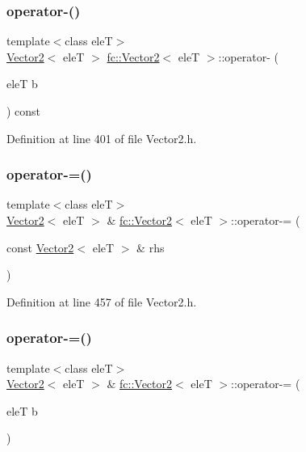\subsubsection{\texorpdfstring{operator-\/()}{operator-()}\hspace{0.1cm}{\footnotesize\ttfamily [2/2]}}
{\footnotesize\ttfamily template$<$class eleT$>$ \\
\hyperlink{classfc_1_1Vector2}{Vector2}$<$ eleT $>$ \hyperlink{classfc_1_1Vector2}{fc\+::\+Vector2}$<$ eleT $>$\+::operator-\/ (\begin{DoxyParamCaption}\item[{eleT}]{b }\end{DoxyParamCaption}) const}



Definition at line 401 of file Vector2.\+h.

\mbox{\label{classfc_1_1Vector2_acf30967fe6f42911aeea516543eb726e}} 
\subsubsection{\texorpdfstring{operator-\/=()}{operator-=()}\hspace{0.1cm}{\footnotesize\ttfamily [1/2]}}
{\footnotesize\ttfamily template$<$class eleT$>$ \\
\hyperlink{classfc_1_1Vector2}{Vector2}$<$ eleT $>$ \& \hyperlink{classfc_1_1Vector2}{fc\+::\+Vector2}$<$ eleT $>$\+::operator-\/= (\begin{DoxyParamCaption}\item[{const \hyperlink{classfc_1_1Vector2}{Vector2}$<$ eleT $>$ \&}]{rhs }\end{DoxyParamCaption})}



Definition at line 457 of file Vector2.\+h.

\mbox{\label{classfc_1_1Vector2_aea3fcca0a96a88e0d8623a07e140c669}} 
\subsubsection{\texorpdfstring{operator-\/=()}{operator-=()}\hspace{0.1cm}{\footnotesize\ttfamily [2/2]}}
{\footnotesize\ttfamily template$<$class eleT$>$ \\
\hyperlink{classfc_1_1Vector2}{Vector2}$<$ eleT $>$ \& \hyperlink{classfc_1_1Vector2}{fc\+::\+Vector2}$<$ eleT $>$\+::operator-\/= (\begin{DoxyParamCaption}\item[{eleT}]{b }\end{DoxyParamCaption})}



